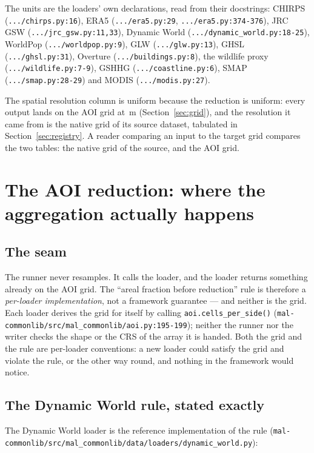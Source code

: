\documentclass[11pt,a4paper]{article}
\newcommand{\code}[1]{\texttt{#1}}
\begin{document}
The units are the loaders' own declarations, read from their docstrings:
CHIRPS (\code{.../chirps.py:16}), ERA5 (\code{.../era5.py:29},
\code{.../era5.py:374-376}), JRC GSW (\code{.../jrc\_gsw.py:11,33}),
Dynamic World (\code{.../dynamic\_world.py:18-25}), WorldPop
(\code{.../worldpop.py:9}), GLW (\code{.../glw.py:13}), GHSL
(\code{.../ghsl.py:31}), Overture (\code{.../buildings.py:8}), the wildlife
proxy (\code{.../wildlife.py:7-9}), GSHHG (\code{.../coastline.py:6}), SMAP
(\code{.../smap.py:28-29}) and MODIS (\code{.../modis.py:27}).

The spatial resolution column is uniform because the reduction is uniform:
every output lands on the AOI grid at \,m
(Section~\ref{sec:grid}), and the resolution it came from is the native grid
of its source dataset, tabulated in Section~\ref{sec:registry}. A reader
comparing an input to the target grid compares the two tables: the native
grid of the source, and the AOI grid.

\section{The AOI reduction: where the aggregation actually happens}
\label{sec:reduction}

\subsection{The seam}

The runner never resamples. It calls the loader, and the loader returns
something already on the AOI grid. The ``areal fraction before reduction''
rule is therefore a \emph{per-loader implementation}, not a framework
guarantee --- and neither is the grid. Each loader derives the grid for
itself by calling \code{aoi.cells\_per\_side()}
(\code{mal-commonlib/src/mal\_commonlib/aoi.py:195-199}); neither the runner
nor the writer checks the shape or the CRS of the array it is handed. Both
the grid and the rule are per-loader conventions: a new loader could
satisfy the grid and violate the rule, or the other way round, and nothing
in the framework would notice.

\subsection{The Dynamic World rule, stated exactly}

The Dynamic World loader is the reference implementation of the rule
(\code{mal-commonlib/src/mal\_commonlib/data/loaders/dynamic\_world.py}):
\end{document}
